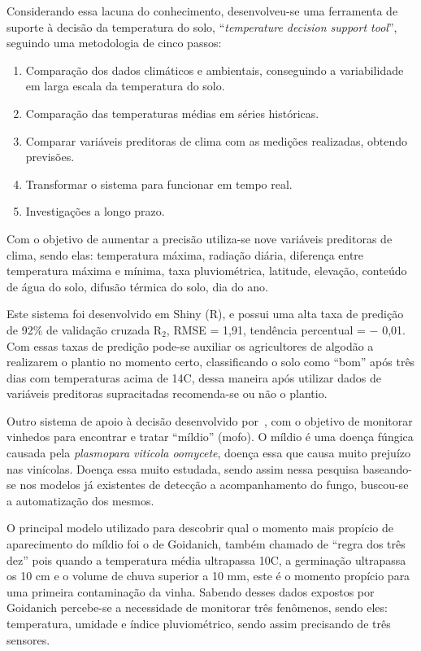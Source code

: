 \documentclass[
article,			%
12pt,				%
oneside,			%
a4paper,			%
english,			%
brazil,				%
sumario=tradicional
]{abntex2}
\begin{document}
Considerando essa lacuna do conhecimento, desenvolveu-se uma ferramenta de suporte à decisão da temperatura do solo, ``\textit{temperature decision support tool}'', seguindo uma metodologia de cinco passos:
\begin{enumerate}
  \item Comparação dos dados climáticos e ambientais, conseguindo a variabilidade em larga escala da temperatura do solo.

  \item Comparação das temperaturas médias em séries históricas.
  \item Comparar variáveis preditoras de clima com as medições realizadas, obtendo previsões.
  \item Transformar o sistema para funcionar em tempo real.
  \item Investigações a longo prazo.
\end{enumerate}

Com o objetivo de aumentar a precisão utiliza-se nove variáveis preditoras de clima, sendo elas: temperatura máxima, radiação diária, diferença entre temperatura máxima e mínima, taxa pluviométrica, latitude, elevação, conteúdo de água do solo, difusão térmica do solo, dia do ano.

Este sistema foi desenvolvido em Shiny (R), e possui uma alta taxa de predição de 92\% de validação cruzada R$_{2}$, RMSE = 1,91, tendência percentual = $-$ 0,01.
Com essas taxas de predição pode-se auxiliar os agricultores de algodão a realizarem o plantio no momento certo, classificando o solo como ``bom'' após três dias com temperaturas acima de 14\textdegree C, dessa maneira após utilizar dados de variáveis preditoras supracitadas recomenda-se ou não o plantio.

Outro sistema de apoio à decisão desenvolvido por~\citeauthor{2}, com o objetivo de monitorar vinhedos para encontrar e tratar ``míldio'' (mofo).
O míldio é uma doença fúngica causada pela \textit{plasmopara viticola oomycete}, doença essa que causa muito prejuízo nas vinícolas\cite{2}. Doença essa muito estudada, sendo assim nessa pesquisa baseando-se nos modelos já existentes de detecção a acompanhamento do fungo, buscou-se a automatização dos mesmos.

O principal modelo utilizado para descobrir qual o momento mais propício de aparecimento do míldio foi o de Goidanich\cite{detectando_milidio}, também chamado de ``regra dos três dez'' pois quando a temperatura média ultrapassa 10\textdegree C, a germinação ultrapassa os 10 cm e o volume de chuva superior a 10 mm, este é o momento propício para uma primeira contaminação da vinha.
Sabendo desses dados expostos por Goidanich\cite{detectando_milidio} percebe-se a necessidade de monitorar três fenômenos, sendo eles: temperatura, umidade e índice pluviométrico, sendo assim precisando de três sensores.
\end{document}
